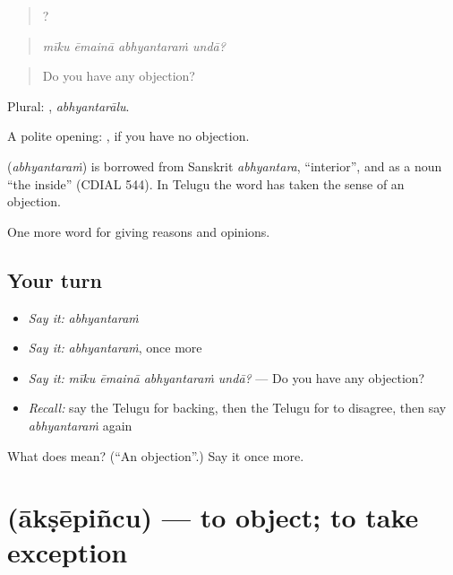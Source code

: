 \begin{quote}
   ?
\end{quote}

\begin{quote}
\emph{mīku ēmainā abhyantaraṁ undā?}
\end{quote}

\begin{quote}
Do you have any objection?
\end{quote}

Plural: , \emph{abhyantarālu}.

A polite opening:   , if you have no objection.

\begin{cousinweb}
\textbf{} (\emph{abhyantaraṁ}) is borrowed from Sanskrit \emph{abhyantara}, \textquotedblleft{}interior\textquotedblright{}, and as a noun \textquotedblleft{}the inside\textquotedblright{} (CDIAL 544). In Telugu the word has taken the sense of an objection.
\end{cousinweb}

\begin{grammarlens}[title={What you've built}]
One more word for giving reasons and opinions.
\end{grammarlens}

\subsection*{Your turn}
\begin{itemize}
\raggedright
  \item \emph{Say it:} \emph{abhyantaraṁ}
  \item \emph{Say it:} \emph{abhyantaraṁ}, once more
  \item \emph{Say it:} \emph{mīku ēmainā abhyantaraṁ undā?} — Do you have any objection?
  \item \emph{Recall:} say the Telugu for backing, then the Telugu for to disagree, then say \emph{abhyantaraṁ} again
\end{itemize}

\begin{tcolorbox}[breakable,colback=teal!4,colframe=teal!35!black,title={Before you move on}]
What does  mean? (\textquotedblleft{}An objection\textquotedblright{}.) Say it once more.
\end{tcolorbox}
\section[\texorpdfstring{\te{ఆక్షేపించు} (ākṣēpiñcu)}{ఆక్షేపించు (ākṣēpiñcu)}]{ (ākṣēpiñcu) — to object; to take exception}

